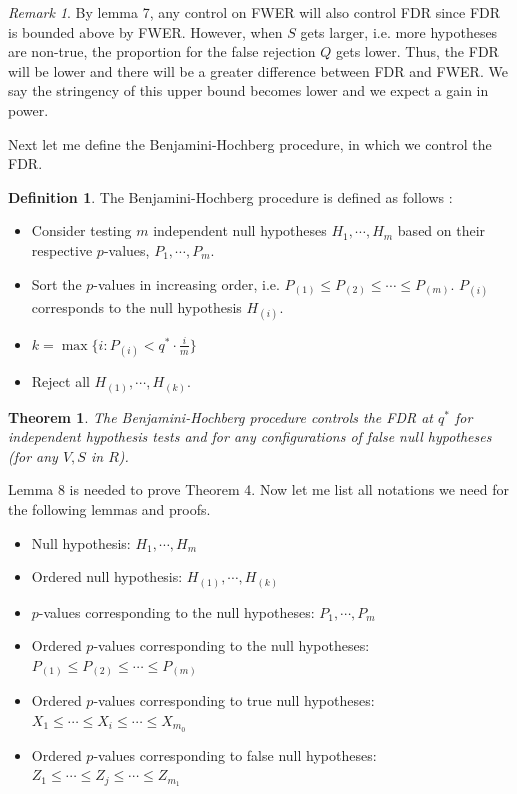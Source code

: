 \documentclass[12pt]{article}
\theoremstyle{plain}
\newtheorem{theorem}{Theorem}
\theoremstyle{definition}
\newtheorem{definition}{Definition}
\theoremstyle{remark}
\newtheorem*{remark}{Remark}
\begin{document}
\begin{remark}
By lemma 7, any control on FWER will also control FDR since FDR is bounded above by FWER. However, when $S$ gets larger, i.e. more hypotheses are non-true, the proportion for the false rejection $Q$ gets lower. Thus, the FDR will be lower and there will be a greater difference between FDR and FWER. We say the stringency of this upper bound becomes lower and we expect a gain in power.\cite{5.3}\cite{5.7}
\end{remark}

Next let me define the Benjamini-Hochberg procedure, in which we control the FDR. 
\begin{definition}
The Benjamini-Hochberg procedure is defined as follows \cite{5.7}:
\begin{itemize}
    \item Consider testing $m$ independent null hypotheses $H_1,\cdots,H_m$ based on their respective $p$-values, $P_1,\cdots,P_m$.
    \item Sort the $p$-values in increasing order, i.e. $P_{(1)}\leq P_{(2)}\leq\cdots\leq P_{(m)}$. $P_{(i)}$ corresponds to the null hypothesis $H_{(i)}$.
    \item $k=\max\{i: P_{(i)}< q^*\cdot \frac{i}{m}\}$
    \item Reject all $H_{(1)},\cdots,H_{(k)}$.
\end{itemize}
\end{definition}





\begin{theorem}
The Benjamini-Hochberg procedure controls the FDR at $q^*$
for independent hypothesis tests and for any configurations of false null hypotheses (for any $V,S$ in $R$). \cite{5.7}
\end{theorem}

Lemma 8 is needed to prove Theorem 4. Now let me list all notations \cite{5.3} we need for the following lemmas and proofs.
\begin{itemize}
    \item Null hypothesis: $H_1,\cdots,H_m$
    \item Ordered null hypothesis: $H_{(1)},\cdots,H_{(k)}$
    \item $p$-values corresponding to the null hypotheses: $P_1,\cdots,P_m$
    \item Ordered $p$-values corresponding to the null hypotheses: $P_{(1)}\leq P_{(2)}\leq\cdots\leq P_{(m)}$
    \item Ordered $p$-values corresponding to true null hypotheses: $X_1\leq \cdots\leq X_i\leq \cdots\leq X_{m_0}$
    \item Ordered $p$-values corresponding to false null hypotheses: $Z_1\leq \cdots\leq Z_j\leq \cdots\leq Z_{m_1}$
\end{itemize}
\end{document}
